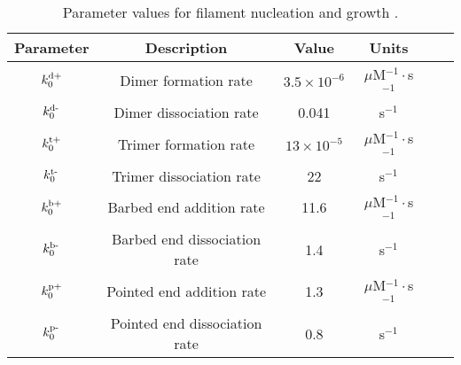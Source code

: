 \documentclass[11pt]{article}
\begin{document}
\begin{table}
\begin{center}
\begin{tabular}{|c|c|c|c|c|c|}\hline
Parameter & Description & Value & Units \\ \hline
$k^\text{d+}_0$ & Dimer formation rate& $3.5 \times 10^{-6}$ & $\mu$M$^{-1}\cdot$s$^{-1}$  \\ 
$k^\text{d-}_0$ & Dimer dissociation rate & 0.041 & s$^{-1}$\\
$k^\text{t+}_0$ & Trimer formation rate& $13 \times 10^{-5}$ & $\mu$M$^{-1}\cdot$s$^{-1}$  \\ 
$k^\text{t-}_0$ & Trimer dissociation rate & 22 & s$^{-1}$ \\
$k^\text{b+}_0$ & Barbed end addition rate& 11.6 & $\mu$M$^{-1}\cdot$s$^{-1}$ \\ 
$k^\text{b-}_0$ & Barbed end dissociation rate & 1.4 & s$^{-1}$\\
$k^\text{p+}_0$ & Pointed end addition rate& 1.3& $\mu$M$^{-1}\cdot$s$^{-1}$  \\ 
$k^\text{p-}_0$ & Pointed end dissociation rate & 0.8 & s$^{-1}$ \\ \hline
\end{tabular}
\caption{\label{tab:params} Parameter values for filament nucleation and growth \cite{rosenbloom2021mechanism}. }
\end{center}
\end{table}
\end{document}
